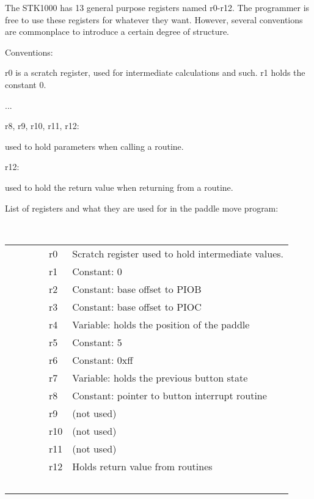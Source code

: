 The STK1000 has 13 general purpose registers named r0-r12. The programmer is free to use these registers for whatever they want.
However, several conventions are commonplace to introduce a certain degree of structure.

Conventions:

r0 is a scratch register, used for intermediate calculations and such.
r1 holds the constant 0.

...

r8, r9, r10, r11, r12:

used to hold parameters when calling a routine.

r12:

used to hold the return value when returning from a routine.


List of registers and what they are used for in the paddle move program:

\begin{table}
    \begin{tabular}{|l|l|}
        r0  & Scratch register used to hold intermediate values. \\
        r1  & Constant: 0 \\ 
        r2  & Constant: base offset to PIOB \\ 
        r3  & Constant: base offset to PIOC \\ 
        r4  & Variable: holds the position of the paddle \\ 
        r5  & Constant: 5 \\ 
        r6  & Constant: 0xff \\ 
        r7  & Variable: holds the previous button state \\ 
        r8  & Constant: pointer to button interrupt routine \\ 
        r9  & (not used) \\ 
        r10 & (not used) \\ 
        r11 & (not used) \\ 
        r12 & Holds return value from routines \\
    \end{tabular}
\end{table}

